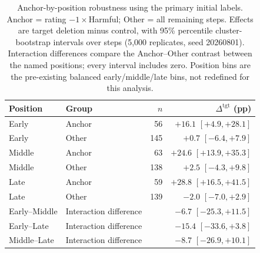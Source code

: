 \documentclass[11pt]{article}
\newcommand{\ci}[2]{[#1, #2]}
\begin{document}
\begin{table}[h]
\centering
\scriptsize
\setlength{\tabcolsep}{3pt}
\begin{tabular}{@{}llrr@{}}
\toprule
Position & Group & $n$ & $\Delta^{\mathrm{tgt}}$ (pp) \\
\midrule
Early  & Anchor & 56  & $+16.1$ $\ci{+4.9}{+28.1}$ \\
Early  & Other  & 145 & $+0.7$ $\ci{-6.4}{+7.9}$ \\
Middle & Anchor & 63  & $+24.6$ $\ci{+13.9}{+35.3}$ \\
Middle & Other  & 138 & $+2.5$ $\ci{-4.3}{+9.8}$ \\
Late   & Anchor & 59  & $+28.8$ $\ci{+16.5}{+41.5}$ \\
Late   & Other  & 139 & $-2.0$ $\ci{-7.0}{+2.9}$ \\
\midrule
Early--Middle & Interaction difference & & $-6.7$ $\ci{-25.3}{+11.5}$ \\
Early--Late   & Interaction difference & & $-15.4$ $\ci{-33.6}{+3.8}$ \\
Middle--Late  & Interaction difference & & $-8.7$ $\ci{-26.9}{+10.1}$ \\
\bottomrule
\end{tabular}
\caption{Anchor-by-position robustness using the primary initial labels. Anchor = rating $-1\times$Harmful; Other = all remaining steps. Effects are target deletion minus control, with 95\% percentile cluster-bootstrap intervals over steps (5{,}000 replicates, seed 20260801). Interaction differences compare the Anchor--Other contrast between the named positions; every interval includes zero. Position bins are the pre-existing balanced early/middle/late bins, not redefined for this analysis.}
\label{tab:anchorposition}
\end{table}
\end{document}
